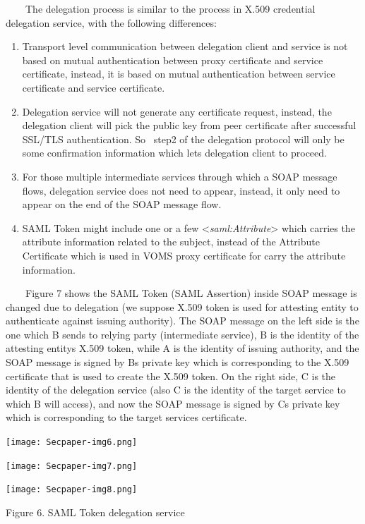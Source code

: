 \documentclass{article}
\newcommand\liststyleLvi{%
\renewcommand\theenumi{\arabic{enumi}}
\renewcommand\theenumii{\arabic{enumii}}
\renewcommand\theenumiii{\arabic{enumiii}}
\renewcommand\theenumiv{\arabic{enumiv}}
\renewcommand\labelenumi{\theenumi.}
\renewcommand\labelenumii{\theenumii.}
\renewcommand\labelenumiii{\theenumiii.}
\renewcommand\labelenumiv{\theenumiv.}
}
\begin{document}
\ \ \ \ The delegation process is similar to the process in X.509
credential delegation service, with the following differences:

\liststyleLvi
\begin{enumerate}
\item Transport level communication between delegation client and
service is not based on mutual authentication between proxy certificate
and service certificate, instead, it is based on mutual authentication
between service certificate and service certificate.
\item Delegation service will not generate any certificate request,
instead, the delegation client will pick the public key from peer
certificate after successful SSL/TLS authentication. So \ step2 of the
delegation protocol will only be some confirmation information which
lets delegation client to proceed. 
\item For those multiple intermediate services through which a SOAP
message flows, delegation service does not need to appear, instead, it
only need to appear on the end of the SOAP message flow.
\item SAML Token might include one or a few
{\textless}\textit{saml:Attribute}{\textgreater} which carries the
attribute information related to the subject, instead of the Attribute
Certificate which is used in VOMS proxy certificate for carry the
attribute information.
\end{enumerate}
\ \ \ \ Figure 7 shows the SAML Token (SAML Assertion) inside SOAP
message is changed due to delegation (we suppose X.509 token is used
for attesting entity to authenticate against issuing authority). The
SOAP message on the left side is the one which B sends to relying party
(intermediate service), B is the identity of the attesting
entity{\textquotesingle}s X.509 token, while A is the identity of
issuing authority, and the SOAP message is signed by
B{\textquotesingle}s private key which is corresponding to the X.509
certificate that is used to create the X.509 token. On the right side,
C is the identity of the delegation service (also C is the identity of
the target service to which B will access), and now the SOAP message is
signed by C{\textquotesingle}s private key which is corresponding to
the target service{\textquotesingle}s certificate.


\bigskip



\begin{center}
\texttt{[image: Secpaper-img6.png]}
\end{center}
\begin{center}
\texttt{[image: Secpaper-img7.png]}
\end{center}
\begin{center}
\texttt{[image: Secpaper-img8.png]}
\end{center}
{\centering
Figure 6. SAML Token delegation service
\par}
\end{document}
